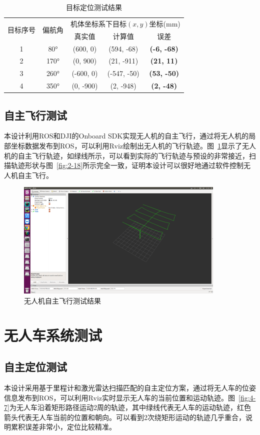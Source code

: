 \clearpage
\begin{table}[htb]
	\centering
	\caption{目标定位测试结果}
	\label{tab:4-2}
	\begin{tabular}{ccccc}
		\toprule
		\multirow{2}{*}{目标序号} & \multirow{2}{*}{偏航角} & \multicolumn{3}{c}{机体坐标系下目标$(x, y)$坐标(mm)} \\ \cmidrule(l){3-5} 
		& & 真实值 & 计算值 & 误差 \\ 
		\midrule
		1 & 80° & (600, 0) & (594, -68) & \textbf{(-6, -68)} \\
		2 & 170° & (0, 900) & (21, -911) & \textbf{(21, 11)} \\
		3 & 260° & (-600, 0) & (-547, -50) & \textbf{(53, -50)} \\
		4 & 350° & (0, -900) & (2, -948) & \textbf{(2, -48)} \\		
		\toprule	
	\end{tabular}
\end{table}

\subsection{自主飞行测试}
本设计利用ROS和DJI的Onboard SDK实现无人机的自主飞行，通过将无人机的局部坐标数据发布到ROS，可以利用Rviz绘制出无人机的飞行轨迹。图~\ref{fig:4-6}显示了无人机的自主飞行轨迹，如绿线所示，可以看到实际的飞行轨迹与预设的非常接近，扫描轨迹形状与图~\ref{fig:2-18}所示完全一致，证明本设计可以很好地通过软件控制无人机自主飞行。

\begin{figure}[htb]
	\centering
	\includegraphics[width=0.6\linewidth]{figures/4-6.png}
	\caption{无人机自主飞行测试结果}
	\label{fig:4-6}
\end{figure}

\section{无人车系统测试}
\subsection{自主定位测试}
本设计采用基于里程计和激光雷达扫描匹配的自主定位方案，通过将无人车的位姿信息发布到ROS，可以利用Rviz实时显示无人车的当前位置和运动轨迹。图~\ref{fig:4-7}为无人车沿着矩形路径运动2周的轨迹，其中绿线代表无人车的运动轨迹，红色箭头代表无人车当前的位置和朝向。可以看到2次绕矩形运动的轨迹几乎重合，说明累积误差非常小，定位比较精准。


